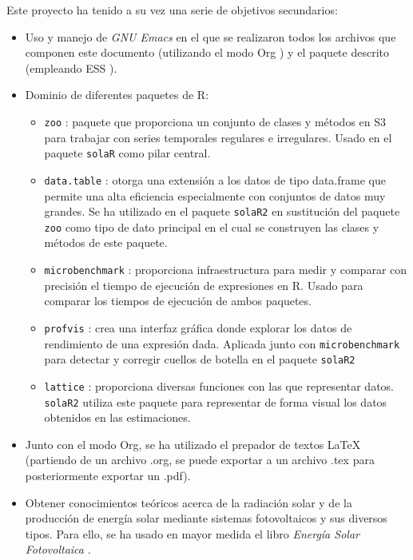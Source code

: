 Este proyecto ha tenido a su vez una serie de objetivos secundarios:
\begin{itemize}
\item Uso y manejo de \emph{GNU Emacs} \cite{emacs85} en el que se realizaron todos los archivos que componen este documento (utilizando el modo Org \cite{dominik03}) y el paquete descrito (empleando ESS \cite{ess24}).
\item Dominio de diferentes paquetes de R:
\begin{itemize}
\item \texttt{zoo} \cite{zeileis05}: paquete que proporciona un conjunto de clases y métodos en S3 para trabajar con series temporales regulares e irregulares. Usado en el paquete \texttt{solaR} como pilar central.
\item \texttt{data.table} \cite{barrett24}: otorga una extensión a los datos de tipo data.frame que permite una alta eficiencia especialmente con conjuntos de datos muy grandes. Se ha utilizado en el paquete \texttt{solaR2} en sustitución del paquete \texttt{zoo} como tipo de dato principal en el cual se construyen las clases y métodos de este paquete.
\item \texttt{microbenchmark} \cite{mersmann23}: proporciona infraestructura para medir y comparar con precisión el tiempo de ejecución de expresiones en R. Usado para comparar los tiempos de ejecución de ambos paquetes.
\item \texttt{profvis} \cite{wickham24}: crea una interfaz gráfica donde explorar los datos de rendimiento de una expresión dada. Aplicada junto con \texttt{microbenchmark} para detectar y corregir cuellos de botella en el paquete \texttt{solaR2}
\item \texttt{lattice} \cite{sarkar08}: proporciona diversas funciones con las que representar datos. \texttt{solaR2} utiliza este paquete para representar de forma visual los datos obtenidos en las estimaciones.
\end{itemize}
\item Junto con el modo Org, se ha utilizado el prepador de textos \LaTeX{} (partiendo de un archivo .org, se puede exportar a un archivo .tex para posteriormente exportar un .pdf).
\item Obtener conocimientos teóricos acerca de la radiación solar y de la producción de energía solar mediante sistemas fotovoltaicos y sus diversos tipos. Para ello, se ha usado en mayor medida el libro \emph{Energía Solar Fotovoltaica} \cite{Perpinan2023}.
\end{itemize}

